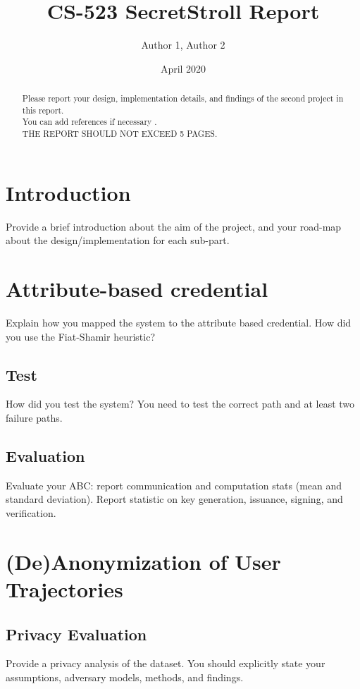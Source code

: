\documentclass[10pt,conference,compsocconf]{IEEEtran}
\title{CS-523 SecretStroll Report}
\author{Author 1, Author 2}
\date{April 2020}
\begin{document}
\maketitle

\begin{abstract}
    Please report your design, implementation details, and findings of the second project in this report. \\
    You can add references if necessary \cite{article}. \\
    THE REPORT SHOULD NOT EXCEED 5 PAGES.
\end{abstract}

\section{Introduction}

Provide a brief introduction about the aim of the project, and your road-map about the design/implementation for each sub-part.

\section{Attribute-based credential}
Explain how you mapped the system to the attribute based credential. How did you
use the Fiat-Shamir heuristic?

\subsection{Test}
How did you test the system?
You need to test the correct path and at least two failure paths.

\subsection{Evaluation}
Evaluate your ABC: report communication and computation stats (mean and standard
deviation). Report statistic on key generation, issuance, signing, and
verification.

\section{(De)Anonymization of User Trajectories}

\subsection{Privacy Evaluation}
Provide a privacy analysis of the dataset. You should explicitly state your assumptions, adversary
models, methods, and findings.
\end{document}
